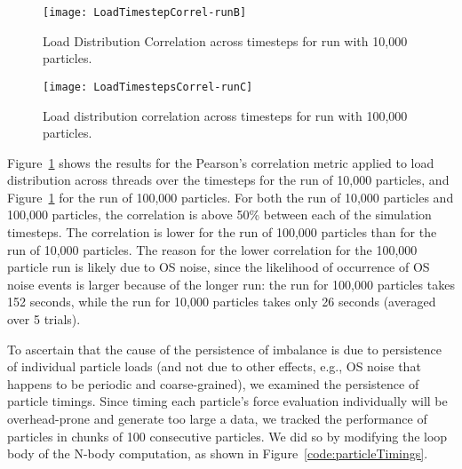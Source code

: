 \documentclass[11pt]{article}
\begin{document}
\begin{figure}[ht!]
\label{fig:timestepCorrel-runB}
\begin{center}
\texttt{[image: LoadTimestepCorrel-runB]}
\end{center}
\caption{\label{fig:timestepCorrel-runB}Load Distribution Correlation across timesteps for run with 10,000 particles.}
\end{figure}

\begin{figure}[ht!]
\label{fig:timestepCorrel-runC}
\begin{center}
\texttt{[image: LoadTimestepsCorrel-runC]}
\end{center}
\caption{\label{fig:timestepCorrel-runC}Load distribution correlation
  across timesteps for run with 100,000 particles.}
\end{figure}

Figure~\ref{fig:timestepCorrel-runB} shows the results for the
Pearson's correlation metric applied to load distribution across
threads over the timesteps for the run of 10,000 particles, and
Figure~\ref{fig:timestepCorrel-runB} for the run of 100,000
particles. For both the run of 10,000 particles and 100,000 particles,
the correlation is above 50\% between each of the simulation
timesteps. The correlation is lower for the run of 100,000 particles than for
the run of 10,000 particles. The reason for the lower correlation for
the 100,000 particle run is likely due to OS noise, since the
likelihood of occurrence of OS noise events is larger because of the
longer run: the run for 100,000 particles takes 152 seconds, while the
run for 10,000 particles takes only 26 seconds (averaged over 5
trials). 


To ascertain that the cause of the persistence of imbalance is due to
persistence of individual particle loads (and not due to other effects, e.g.,
OS noise that happens to be periodic and coarse-grained), we examined
the persistence of particle timings. Since timing each particle's
force evaluation individually will be overhead-prone and generate too
large a data, we tracked the performance of particles in chunks of 100
consecutive particles. We did so by modifying the loop body of the N-body
computation, as shown in Figure~\ref{code:particleTimings}.
\end{document}
